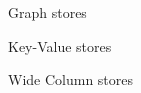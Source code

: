 \documentclass{llncs}
\begin{document}
\begin{itemize}
    Graph stores
    
    
    Key-Value stores
    
    Wide Column stores
    

\end{itemize}
\end{document}
